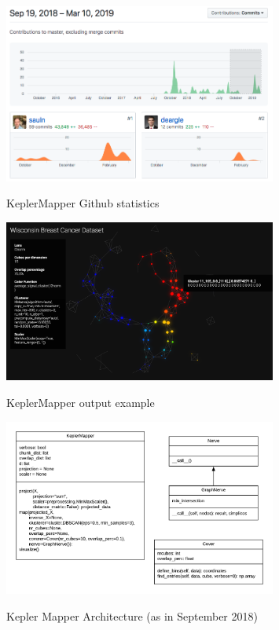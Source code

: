 \begin{figure}[h!]
	\caption{KeplerMapper Github statistics}
	\centering
	\includegraphics[width=0.8\textwidth]{images/keplermappergithubstats.png}
	\label{fig:keplermappergithubstats}
\end{figure} 
\begin{figure}[h!]
	\caption{KeplerMapper output example}
	\centering
	\includegraphics[width=0.8\textwidth]{images/keplermapper.png}
	\label{fig:keplermapperoutput}
\end{figure} 

\begin{figure}[h!]
\caption{Kepler Mapper Architecture (as in September 2018)}
\centering
\includegraphics[width=0.8\textwidth]{images/KMapper.png}
\label{fig:keplermapper}
\end{figure}


